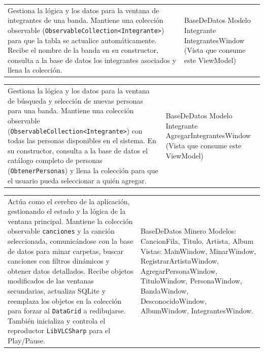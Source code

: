 \documentclass{article}
\newcommand{\tarjeta}[3]{%
      \begin{center}
      \begin{tabular}{|>{\raggedright\arraybackslash}p{7.8cm}|>{\raggedright\arraybackslash}p{4.2cm}|}
        \hline
        \multicolumn{2}{|c|}{#1} \\ \hline
        #2 & #3 \\ \hline
      \end{tabular}
      \end{center}
    }
\begin{document}
\tarjeta{IntegrantesWindowViewModel (ViewModel)}
{Gestiona la lógica y los datos para la ventana de integrantes de una banda.\newline
Mantiene una colección observable (\texttt{ObservableCollection<Integrante>}) para que la tabla se actualice automáticamente.\newline
Recibe el nombre de la banda en su constructor, consulta a la base de datos los integrantes asociados y llena la colección.}
{BaseDeDatos \newline
Modelo Integrante\newline
IntegrantesWindow (Vista que consume este ViewModel)}

\tarjeta{AgregarIntegrantesWindowViewModel (ViewModel)}
{Gestiona la lógica y los datos para la ventana de búsqueda y selección de nuevas personas para una banda.\newline
Mantiene una colección observable (\texttt{ObservableCollection<Integrante>}) con todas las personas disponibles en el sistema.\newline
En su constructor, consulta a la base de datos el catálogo completo de personas (\texttt{ObtenerPersonas}) y llena la colección para que el usuario pueda seleccionar a quién agregar.
}
{BaseDeDatos \newline
Modelo Integrante\newline
AgregarIntegrantesWindow (Vista que consume este ViewModel)
}

\tarjeta{MainWindowViewModel (ViewModel Central)}
{Actúa como el cerebro de la aplicación, gestionando el estado y la lógica de la ventana principal.\newline
Mantiene la colección observable \texttt{canciones} y la canción seleccionada, comunicándose con la base de datos para minar carpetas, buscar canciones con filtros dinámicos y obtener datos detallados.\newline
Recibe objetos modificados de las ventanas secundarias, actualiza SQLite y reemplaza los objetos en la colección para forzar al \texttt{DataGrid} a redibujarse. También inicializa y controla el reproductor \texttt{LibVLCSharp}\cite{libvlcsharp} para el Play/Pause.
}
{BaseDeDatos\newline
Minero \newline
Modelos: CancionFila, Titulo, Artista, Album\newline
Vistas: MainWindow, MinarWindow, RegistrarArtistaWindow, AgregarPersonaWindow, TituloWindow, PersonaWindow, BandaWindow, DesconocidoWindow, AlbumWindow, IntegrantesWindow.
}
\end{document}
